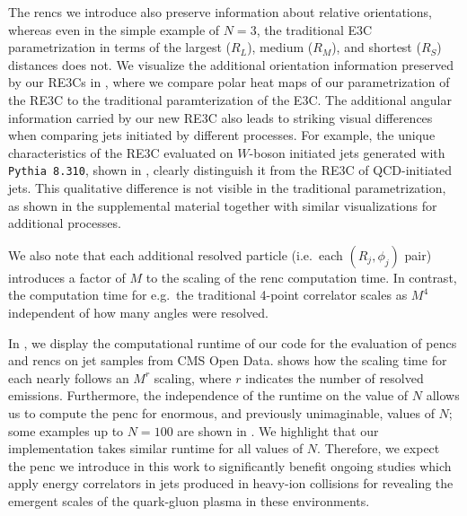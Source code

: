 The \glspl{renc} we introduce also preserve information about relative orientations, whereas even in the simple example of $N=3$, the traditional E3C parametrization in terms of the largest ($R_L$), medium ($R_M$), and shortest ($R_S$) distances does not.
%
We visualize the additional orientation information preserved by our RE3Cs in , where we compare polar heat maps of our parametrization of the RE3C to the traditional paramterization of the E3C.
%
The additional angular information carried by our new RE3C also leads to striking visual differences when comparing jets initiated by different processes.
%
For example, the unique characteristics of the RE3C evaluated on $W$-boson initiated jets generated with \texttt{Pythia 8.310}, shown in , clearly distinguish it from the RE3C of QCD-initiated jets.
%
This qualitative difference is not visible in the traditional parametrization, as shown in the supplemental material together with similar visualizations for additional processes.


We also note that each additional resolved particle (i.e.\ each \((R_j, \phi_j)\) pair) introduces a factor of $M$ to the scaling of the \gls{renc} computation time.
%
In contrast, the computation time for e.g.~the traditional 4-point correlator scales as $M^4$ independent of how many angles were resolved.


In , we display the computational runtime of our code for the evaluation of \glspl{penc} and \glspl{renc} on jet samples from CMS Open Data.
%
 shows how the scaling time for each nearly follows an \(M^r\) scaling, where \(r\) indicates the number of resolved emissions.
%
Furthermore, the independence of the runtime on the value of \(N\) allows us to compute the \gls{penc} for enormous, and previously unimaginable, values of \(N\);
%
some examples up to \(N = 100\) are shown in .
%
We highlight that our implementation takes similar runtime for all values of $N$.
%
Therefore, we expect the \gls{penc} we introduce in this work to significantly benefit ongoing studies which apply energy correlators in jets produced in heavy-ion collisions for revealing the emergent scales of the quark-gluon plasma in these environments.

